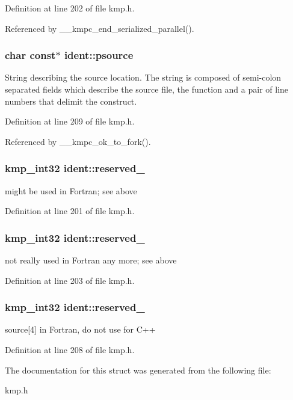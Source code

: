 Definition at line 202 of file kmp.\-h.



Referenced by \-\_\-\-\_\-kmpc\-\_\-end\-\_\-serialized\-\_\-parallel().

\hypertarget{structident_a8c2ccc106967f36d7191d59d4d5a65dc}{
\subsubsection[{psource}]{\setlength{\rightskip}{0pt plus 5cm}char const$\ast$ ident\-::psource}}\label{structident_a8c2ccc106967f36d7191d59d4d5a65dc}
String describing the source location. The string is composed of semi-\/colon separated fields which describe the source file, the function and a pair of line numbers that delimit the construct. 

Definition at line 209 of file kmp.\-h.



Referenced by \-\_\-\-\_\-kmpc\-\_\-ok\-\_\-to\-\_\-fork().

\hypertarget{structident_a8a098c07080704af1d89e401a1b4d10f}{
\subsubsection[{reserved\-\_\-1}]{\setlength{\rightskip}{0pt plus 5cm}kmp\-\_\-int32 ident\-::reserved\-\_}}\label{structident_a8a098c07080704af1d89e401a1b4d10f}
might be used in Fortran; see above 

Definition at line 201 of file kmp.\-h.

\hypertarget{structident_a91db2d18476e0a527ba20e04ca2c3e74}{
\subsubsection[{reserved\-\_\-2}]{\setlength{\rightskip}{0pt plus 5cm}kmp\-\_\-int32 ident\-::reserved\-\_}}\label{structident_a91db2d18476e0a527ba20e04ca2c3e74}
not really used in Fortran any more; see above 

Definition at line 203 of file kmp.\-h.

\hypertarget{structident_ae29e80f6fc150f73c1790c8796bcfd9f}{
\subsubsection[{reserved\-\_\-3}]{\setlength{\rightskip}{0pt plus 5cm}kmp\-\_\-int32 ident\-::reserved\-\_}}\label{structident_ae29e80f6fc150f73c1790c8796bcfd9f}
source\mbox{[}4\mbox{]} in Fortran, do not use for C++ 

Definition at line 208 of file kmp.\-h.



The documentation for this struct was generated from the following file\-:\begin{DoxyCompactItemize}
\item 
kmp.\-h\end{DoxyCompactItemize}
